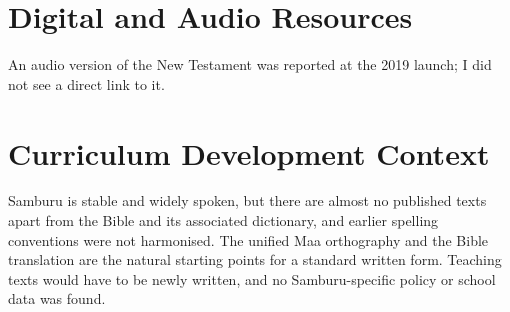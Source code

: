 \documentclass[12pt]{article}
\begin{document}
\section{Digital and Audio Resources}
An audio version of the New Testament was reported at the 2019 launch; I did not see a direct link to it.

\section{Curriculum Development Context}
Samburu is stable and widely spoken, but there are almost no published texts apart from the Bible and its associated dictionary, and earlier spelling conventions were not harmonised. The unified Maa orthography and the Bible translation are the natural starting points for a standard written form. Teaching texts would have to be newly written, and no Samburu-specific policy or school data was found.
\end{document}
